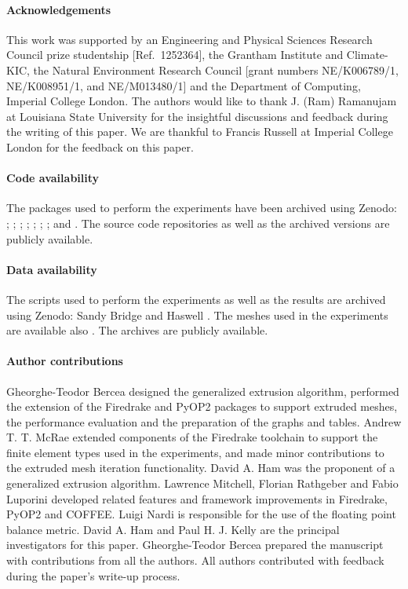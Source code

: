 \documentclass[11pt, a4paper]{scrartcl}
\begin{document}
\appendix
\paragraph{Acknowledgements}
This work was supported by an Engineering and Physical Sciences
Research Council prize studentship [Ref.\ 1252364], the Grantham
Institute and Climate-KIC, the Natural Environment Research Council
[grant numbers NE/K006789/1, NE/K008951/1, and NE/M013480/1] and the
Department of Computing, Imperial College London. The authors would
like to thank J. (Ram) Ramanujam at Louisiana State University for the
insightful discussions and feedback during the writing of this
paper. We are thankful to Francis Russell at Imperial College London
for the feedback on this paper.

\paragraph{Code availability}
The packages used to perform the experiments have been archived using
Zenodo: \cite{zenodo_firedrake}; \cite{zenodo_petsc};
\cite{zenodo_petsc4py}; \cite{zenodo_fiat}; \cite{zenodo_ufl};
\cite{zenodo_ffc}; \cite{zenodo_pyop2}; and
\cite{zenodo_coffee}. The source code repositories as well as the
archived versions are publicly available.

\paragraph{Data availability}
The scripts used to perform the experiments as well as the results are
archived using Zenodo: Sandy Bridge \citep{bercea_2016_61920} and
Haswell \citep{bercea_2016_61919}. The meshes used in the experiments
are available also \citep{bercea_2016_61819}. The archives are
publicly available.

\paragraph{Author contributions}
Gheorghe-Teodor Bercea designed the generalized extrusion algorithm,
performed the extension of the Firedrake and PyOP2 packages to support
extruded meshes, the performance evaluation and the preparation of the
graphs and tables. Andrew T. T. McRae extended components of the
Firedrake toolchain to support the finite element types used in the
experiments, and made minor contributions to the extruded mesh
iteration functionality. David A. Ham was the proponent of a
generalized extrusion algorithm. Lawrence Mitchell, Florian Rathgeber
and Fabio Luporini developed related features and framework
improvements in Firedrake, PyOP2 and COFFEE. Luigi Nardi is
responsible for the use of the floating point balance metric. David
A. Ham and Paul H. J. Kelly are the principal investigators for this
paper. Gheorghe-Teodor Bercea prepared the manuscript with
contributions from all the authors. All authors contributed with
feedback during the paper's write-up process.
\end{document}
